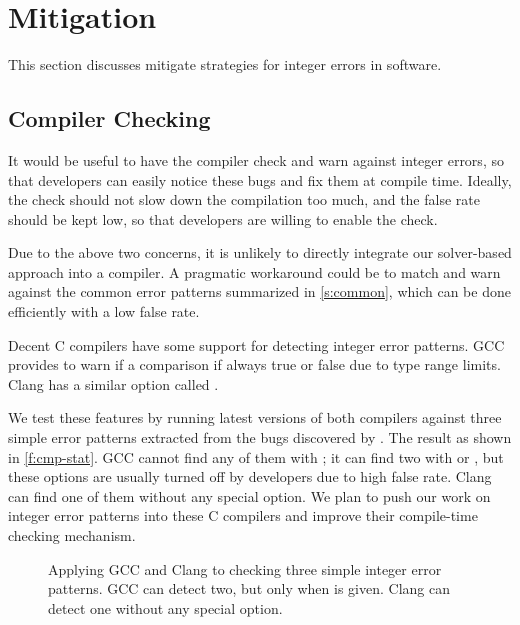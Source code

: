 \section{Mitigation}
\label{s:miti}

This section discusses mitigate strategies for integer errors in
software.

\subsection{Compiler Checking}

It would be useful to have the compiler check and warn against
integer errors, so that developers can easily notice these bugs and
fix them at compile time.  Ideally, the check should not slow down
the compilation too much, and the false rate should be kept low,
so that developers are willing to enable the check.

Due to the above two concerns, it is unlikely to directly integrate
our solver-based approach into a compiler.  A pragmatic workaround
could be to match and warn against the common error patterns
summarized in \autoref{s:common}, which can be done efficiently
with a low false rate.

Decent C compilers have some support for detecting integer error
patterns.
%
GCC provides  to warn if a comparison if always
true or false due to type range limits.
%
Clang has a similar option called .

We test these features by running latest versions of both compilers
against three simple error patterns extracted from the bugs discovered
by \sys.  The result as shown in \autoref{f:cmp-stat}.  GCC cannot
find any of them with ; it can find two with 
or , but these options are usually turned off by
developers due to high false rate.  Clang can find one of them
without any special option.
%
%
We plan to push our work on integer error patterns into these C
compilers and improve their compile-time checking mechanism.

\begin{figure}
\centering

\caption{Applying GCC and Clang to checking three simple integer
error patterns.  GCC can detect two, but only when  is
given.  Clang can detect one without any special option.}
\label{f:cmp-stat}
\end{figure}

